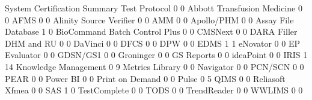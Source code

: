 \documentclass{article}
\begin{document}
\begin{Schunk}
\begin{Soutput}
                                System Certification Summary Test Protocol
                                                           0             0
  Abbott Transfusion Medicine                              0             0
  AFMS                                                     0             0
  Alinity Source Verifier                                  0             0
  AMM                                                      0             0
  Apollo/PHM                                               0             0
  Assay File Database                                      1             0
  BioCommand Batch Control Plus                            0             0
  CMSNext                                                  0             0
  DARA Filler DHM and RU                                   0             0
  DaVinci                                                  0             0
  DFCS                                                     0             0
  DPW                                                      0             0
  EDMS                                                     1             1
  eNovator                                                 0             0
  EP Evaluator                                             0             0
  GDSN/GS1                                                 0             0
  Groninger                                                0             0
  GS Reports                                               0             0
  ideaPoint                                                0             0
  IRIS                                                     1            14
  Knowledge Management                                     0             9
  Metrics Library                                          0             0
  Navigator                                                0             0
  PCN/SCN                                                  0             0
  PEAR                                                     0             0
  Power BI                                                 0             0
  Print on Demand                                          0             0
  Pulse                                                    0             5
  QIMS                                                     0             0
  Reliasoft Xfmea                                          0             0
  SAS                                                      1             0
  TestComplete                                             0             0
  TODS                                                     0             0
  TrendReader                                              0             0
  WWLIMS                                                   0             0
                               

\end{Soutput}
\end{Schunk}
\end{document}
